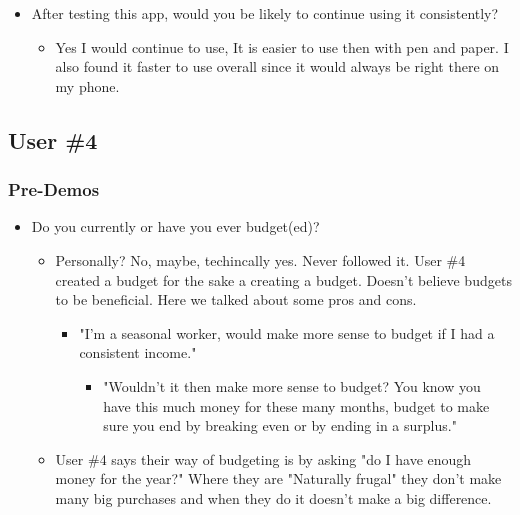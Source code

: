 \documentclass{chi2011}
\begin{document}
\begin{itemize}[noitemsep]
\begin{itemize}[noitemsep]
		\item After testing this app, would you be likely to continue using it consistently? 
		\begin{itemize}[noitemsep]
				\item Yes I would continue to use, It is easier to use then with
					pen and paper. I also found it faster to use overall since
					it would always be right there on my phone.
		\end{itemize}
	\end{itemize}
	
	
	\subsection{User \#4}
	\subsubsection{Pre-Demos}
	\begin{itemize}[noitemsep]
		\item Do you currently or have you ever budget(ed)?
		\begin{itemize}[noitemsep]
			\item 
				Personally? No, maybe, techincally yes. Never followed it. User \#4 created a budget for the
				sake a creating a budget. Doesn't believe budgets to be beneficial. Here we talked about
				some pros and cons.
				\begin{itemize}[noitemsep]
					\item "I'm a seasonal worker, would make more sense to budget if I had a consistent 
					      income."
					\begin{itemize}[noitemsep]
						\item "Wouldn't it then make more sense to budget? You know you have this much 
							   money for these many months, budget to make sure you end by breaking even or
							   by ending in a surplus."
					\end{itemize}
				\end{itemize}
			\item 
				User \#4 says their way of budgeting is by asking "do I have enough money for the year?" 
				Where they are "Naturally frugal" they don't make many big purchases and when they do it 
				doesn't make a big difference. 
		\end{itemize}
	\end{itemize}
	

\end{itemize}
\end{document}
